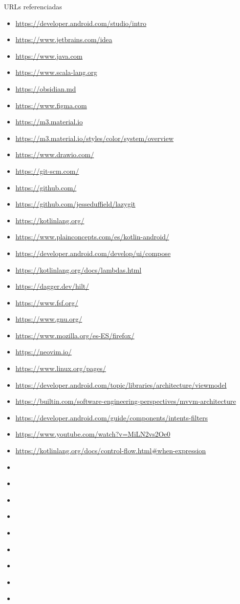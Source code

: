 \newpage
URLs referenciadas
\begin{itemize}
  \item \url{https://developer.android.com/studio/intro}
  \item \url{https://www.jetbrains.com/idea}
  \item \url{https://www.java.com}
  \item \url{https://www.scala-lang.org}
  \item \url{https://obsidian.md}
  \item \url{https://www.figma.com}
  \item \url{https://m3.material.io}
  \item \url{https://m3.material.io/styles/color/system/overview}
  \item \url{https://www.drawio.com/}
  \item \url{https://git-scm.com/}
  \item \url{https://github.com/}
  \item \url{https://github.com/jesseduffield/lazygit}
  \item \url{https://kotlinlang.org/}
  \item \url{https://www.plainconcepts.com/es/kotlin-android/}
  \item \url{https://developer.android.com/develop/ui/compose}
  \item \url{https://kotlinlang.org/docs/lambdas.html}
  \item \url{https://dagger.dev/hilt/}
  \item \url{https://www.fsf.org/}
  \item \url{https://www.gnu.org/}
  \item \url{https://www.mozilla.org/es-ES/firefox/}
  \item \url{https://neovim.io/}
  \item \url{https://www.linux.org/pages/}
  \item \url{https://developer.android.com/topic/libraries/architecture/viewmodel}
  \item \url{https://builtin.com/software-engineering-perspectives/mvvm-architecture}
  \item \url{https://developer.android.com/guide/components/intents-filters}
  \item \url{https://www.youtube.com/watch?v=MiLN2vs2Oe0}
  \item \url{https://kotlinlang.org/docs/control-flow.html#when-expression}
  \item \url{}
  \item \url{}
  \item \url{}
  \item \url{}
  \item \url{}
  \item \url{}
  \item \url{}
  \item \url{}
  \item \url{}
\end{itemize}

\makeBib


